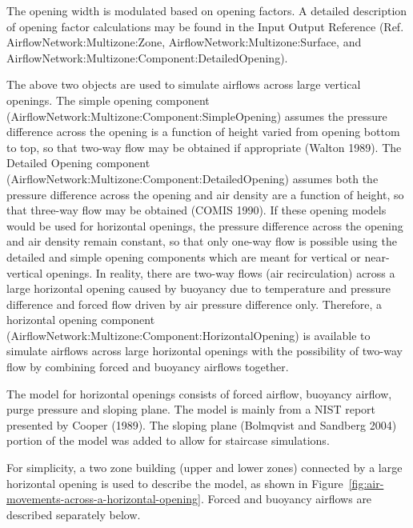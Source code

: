 The opening width is modulated based on opening factors. A detailed description of opening factor calculations may be found in the Input Output Reference (Ref. AirflowNetwork:Multizone:Zone, AirflowNetwork:Multizone:Surface, and AirflowNetwork:Multizone:Component:DetailedOpening).

The above two objects are used to simulate airflows across large vertical openings. The simple opening component (AirflowNetwork:Multizone:Component:SimpleOpening) assumes the pressure difference across the opening is a function of height varied from opening bottom to top, so that two-way flow may be obtained if appropriate (Walton 1989). The Detailed Opening component (AirflowNetwork:Multizone:Component:DetailedOpening) assumes both the pressure difference across the opening and air density are a function of height, so that three-way flow may be obtained (COMIS 1990). If these opening models would be used for horizontal openings, the pressure difference across the opening and air density remain constant, so that only one-way flow is possible using the detailed and simple opening components which are meant for vertical or near-vertical openings. In reality, there are two-way flows (air recirculation) across a large horizontal opening caused by buoyancy due to temperature and pressure difference and forced flow driven by air pressure difference only. Therefore, a horizontal opening component (AirflowNetwork:Multizone:Component:HorizontalOpening) is available to simulate airflows across large horizontal openings with the possibility of two-way flow by combining forced and buoyancy airflows together.

The model for horizontal openings consists of forced airflow, buoyancy airflow, purge pressure and sloping plane. The model is mainly from a NIST report presented by Cooper (1989). The sloping plane (Bolmqvist and Sandberg 2004) portion of the model was added to allow for staircase simulations.

For simplicity, a two zone building (upper and lower zones) connected by a large horizontal opening is used to describe the model, as shown in Figure~\ref{fig:air-movements-across-a-horizontal-opening}. Forced and buoyancy airflows are described separately below.

